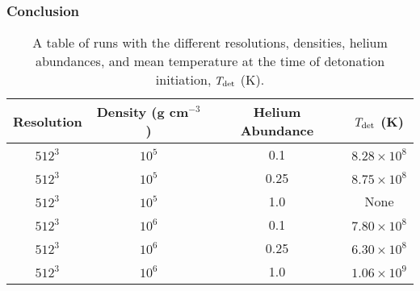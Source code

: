 \documentclass{beamer}
\begin{document}
\begin{frame}
        \frametitle{Conclusion}

\begin{table}[!htb]
        \caption[A table of helium-carbon-oxygen runs with different resolution, RMS velocity and mean temperature..]{A table of runs with the different resolutions, densities, helium abundances, and mean temperature at the time of detonation initiation, $T_{\rm det}$ (K).}
  \begin{center}
      \begin{tabular}{|c|c|c|c|}
        \hline
              Resolution & Density (g cm$^{-3}$) & Helium Abundance & $T_{\rm det}$ (K)\\
        \hline\hline
        $512^3$   & $10^5$ & 0.1 & $8.28 \times 10^8$  \\
        $512^3$   & $10^5$ & 0.25 & $8.75 \times 10^8$  \\
        $512^3$   & $10^5$ & 1.0 & None  \\
        $512^3$   & $10^6$ & 0.1 & $7.80 \times 10^8$  \\
        $512^3$   & $10^6$ & 0.25 & $6.30 \times 10^8$  \\
        $512^3$   & $10^6$ & 1.0 & $1.06 \times 10^9$  \\
        \hline
   \end{tabular}
  \end{center}
  \label{runs}
\end{table}


\end{frame}
\end{document}
